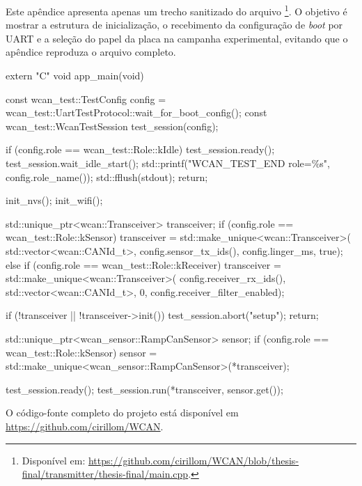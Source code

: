 Este apêndice apresenta apenas um trecho sanitizado do arquivo
\footnote{Disponível em: \url{https://github.com/cirillom/WCAN/blob/thesis-final/transmitter/thesis-final/main.cpp}.}. O objetivo é mostrar a estrutura de inicialização, o recebimento da configuração de \emph{boot} por UART e a seleção do papel da placa na campanha experimental, evitando que o apêndice reproduza o arquivo completo.

\begin{codigo}[language=C++,basicstyle=\ttfamily\scriptsize,breaklines=false,columns=fullflexible,caption={Trecho principal do \emph{firmware} WCAN},label={cod:main-cpp}]
extern "C" void app_main(void)
{
    const wcan_test::TestConfig config =
        wcan_test::UartTestProtocol::wait_for_boot_config();
    const wcan_test::WcanTestSession test_session(config);

    if (config.role == wcan_test::Role::kIdle) {
        test_session.ready();
        test_session.wait_idle_start();
        std::printf("WCAN_TEST_END role=\%s\n", config.role_name());
        std::fflush(stdout);
        return;
    }

    init_nvs();
    init_wifi();

    std::unique_ptr<wcan::Transceiver> transceiver;
    if (config.role == wcan_test::Role::kSensor) {
        transceiver = std::make_unique<wcan::Transceiver>(
            std::vector<wcan::CANId_t>{},
            config.sensor_tx_ids(),
            config.linger_ms,
            true);
    } else if (config.role == wcan_test::Role::kReceiver) {
        transceiver = std::make_unique<wcan::Transceiver>(
            config.receiver_rx_ids(),
            std::vector<wcan::CANId_t>{},
            0,
            config.receiver_filter_enabled);
    }

    if (!transceiver || !transceiver->init()) {
        test_session.abort("setup");
        return;
    }

    std::unique_ptr<wcan_sensor::RampCanSensor> sensor;
    if (config.role == wcan_test::Role::kSensor) {
        sensor = std::make_unique<wcan_sensor::RampCanSensor>(*transceiver);
    }

    test_session.ready();
    test_session.run(*transceiver, sensor.get());
}
\end{codigo}

O código-fonte completo do projeto está disponível em
\url{https://github.com/cirillom/WCAN}.
